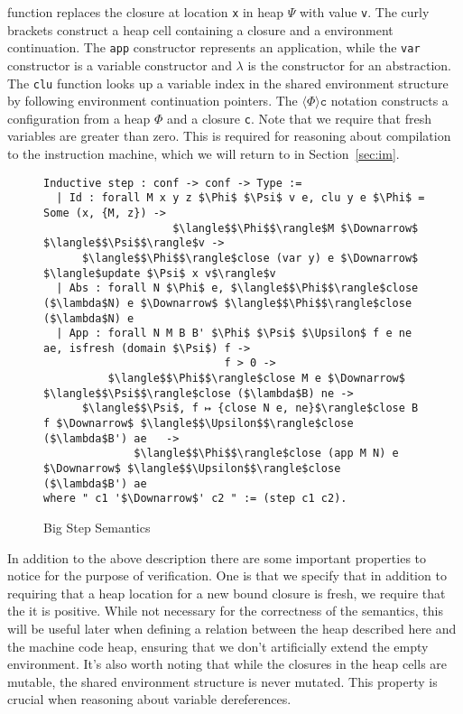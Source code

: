 function replaces the closure at location \texttt{x} in heap $\Psi$ with value
\texttt{v}. The curly brackets construct a heap cell containing a closure and a
environment continuation. The \texttt{app} constructor represents an application,
while the \texttt{var} constructor is a variable constructor and $\lambda$ is
the constructor for an abstraction. The \texttt{clu} function looks up a
variable index in the shared environment structure by following environment
continuation pointers.  The $\langle \Phi \rangle \texttt{c}$ notation
constructs a configuration from a heap $\Phi$ and a closure \texttt{c}. Note
that we require that fresh variables are greater than zero. This is required
for reasoning about compilation to the instruction machine, which we will
return to in Section~\ref{sec:im}.

\begin{figure}
\begin{lstlisting}
Inductive step : conf -> conf -> Type :=
  | Id : forall M x y z $\Phi$ $\Psi$ v e, clu y e $\Phi$ = Some (x, {M, z}) -> 
                    $\langle$$\Phi$$\rangle$M $\Downarrow$ $\langle$$\Psi$$\rangle$v ->
      $\langle$$\Phi$$\rangle$close (var y) e $\Downarrow$ $\langle$update $\Psi$ x v$\rangle$v
  | Abs : forall N $\Phi$ e, $\langle$$\Phi$$\rangle$close ($\lambda$N) e $\Downarrow$ $\langle$$\Phi$$\rangle$close ($\lambda$N) e
  | App : forall N M B B' $\Phi$ $\Psi$ $\Upsilon$ f e ne ae, isfresh (domain $\Psi$) f -> 
                            f > 0 ->
          $\langle$$\Phi$$\rangle$close M e $\Downarrow$ $\langle$$\Psi$$\rangle$close ($\lambda$B) ne -> 
      $\langle$$\Psi$, f ↦ {close N e, ne}$\rangle$close B f $\Downarrow$ $\langle$$\Upsilon$$\rangle$close ($\lambda$B') ae   ->
              $\langle$$\Phi$$\rangle$close (app M N) e $\Downarrow$ $\langle$$\Upsilon$$\rangle$close ($\lambda$B') ae
where " c1 '$\Downarrow$' c2 " := (step c1 c2).
\end{lstlisting}
\caption{Big Step Semantics}
\label{fig:bigstep}
\end{figure}

In addition to the above description there are some important properties to
notice for the purpose of verification. One is that we specify that in addition
to requiring that a heap location for a new bound closure is fresh, we require
that the it is positive. While not necessary for the correctness of the
semantics, this will be useful later when defining a relation between the heap
described here and the machine code heap, ensuring that we don't artificially
extend the empty environment. It's also worth noting that while the closures in
the heap cells are mutable, the shared environment structure is never mutated.
This property is crucial when reasoning about variable dereferences. 

